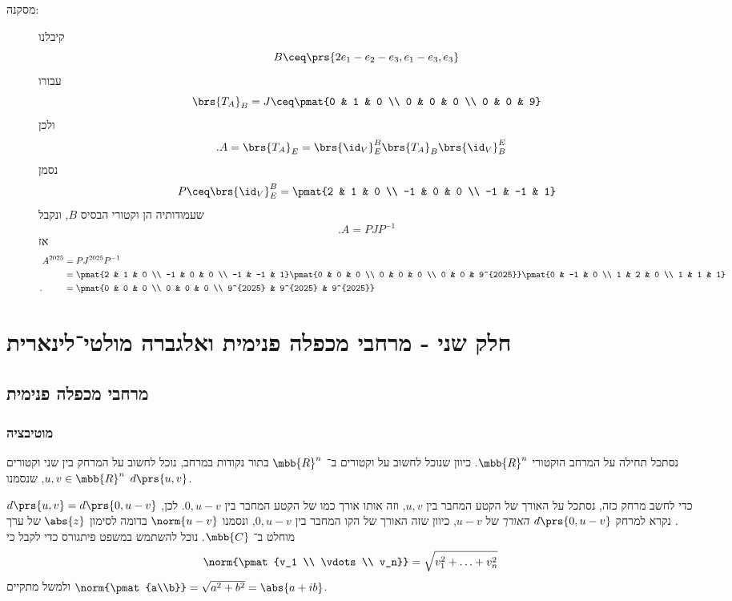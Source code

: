 \documentclass[a4paper,10pt,twoside,openany]{book}
\begin{document}
\begin{solution}
\begin{description}
\item[מסקנה:]
קיבלנו
\[B \ceq \prs{2e_1 - e_2 - e_3, e_1 - e_3, e_3}\]
עבורו
\[\brs{T_A}_B = J \ceq \pmat{0 & 1 & 0 \\ 0 & 0 & 0 \\ 0 & 0 & 9}\]
ולכן
\begin{align*}
\text{.} A &= \brs{T_A}_E
= \brs{\id_V}^{B}_E \brs{T_A}_B \brs{\id_V}^E_B
\end{align*}
נסמן
\[P \ceq \brs{\id_V}^B_E = \pmat{2 & 1 & 0 \\ -1 & 0 & 0 \\ -1 & -1 & 1}\]
שעמודותיה הן וקטורי הבסיס
$B$,
ונקבל
\[\text{.} A = P J P^{-1}\]
אז
\begin{align*}
A^{2025} &= P J^{2025} P^{-1}
\\&= \pmat{2 & 1 & 0 \\ -1 & 0 & 0 \\ -1 & -1 & 1} \pmat{0 & 0 & 0 \\ 0 & 0 & 0 \\ 0 & 0 & 9^{2025}} \pmat{0 & -1 & 0 \\ 1 & 2 & 0 \\ 1 & 1 & 1}
\\ \text{.} \hphantom{A^{2025}} &= \pmat{0 & 0 & 0 \\ 0 & 0 & 0 \\ 9^{2025} & 9^{2025} & 9^{2025}}
\end{align*}
\end{description}
\end{solution}

\part{חלק שני - מרחבי מכפלה פנימית ואלגברה מולטי־לינארית}

\chapter{מרחבי מכפלה פנימית}

\section{מוטיבציה}

נסתכל תחילה על המרחב הוקטורי
$\mbb{R}^n$.
כיוון שנוכל לחשוב על וקטורים ב־%
$\mbb{R}^n$
בתור נקודות במרחב, נוכל לחשוב על המרחק בין שני וקטורים
$u,v \in \mbb{R}^n$,
שנסמנו
$d\prs{u,v}$.

כדי לחשב מרחק כזה, נסתכל על האורך של הקטע המחבר בין
$u,v$,
וזה אותו אורך כמו של הקטע המחבר בין
$0,u-v$.
לכן,
$d\prs{u,v} = d\prs{0,u-v}$.
נקרא למרחק
$d\prs{0,u-v}$
\emph{האורך}
של
$u-v$,
כיוון שזה האורך של הקו המחבר בין
$0,u-v$,
ונסמנו
$\norm{u-v}$
בדומה לסימון
$\abs{z}$
של ערך מוחלט ב־%
$\mbb{C}$.
נוכל להשתמש במשפט פיתגורס כדי לקבל כי
\[\norm{\pmat{v_1 \\ \vdots \\ v_n}} = \sqrt{v_1^2 + \ldots + v_n^2}\]
ולמשל מתקיים
$\norm{\pmat{a\\b}} = \sqrt{a^2 + b^2} = \abs{a + ib}$.
\end{document}
